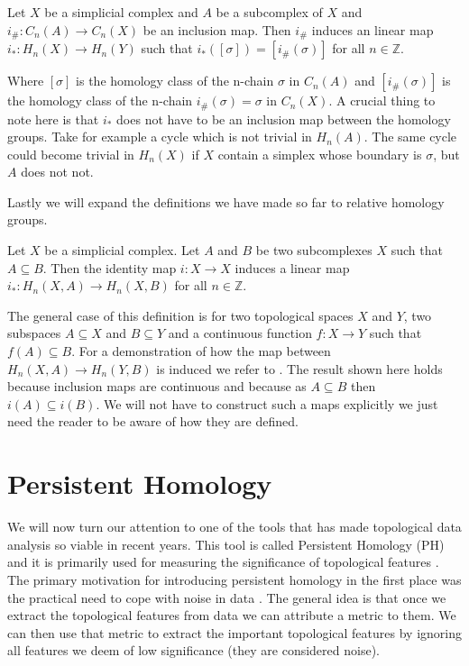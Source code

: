 \begin{defn} Let $X$ be a simplicial complex and $A$ be a subcomplex of $X$ and $i_\#: C_n(A) \to C_n(X)$ be an inclusion map. Then $i_\#$ induces an linear map $i_*: H_n(X) \to H_n(Y)$ such that $i_*([\sigma]) = [i_\#(\sigma)]$ for all $n \in \mathbb{Z}$.
\end{defn}

Where $[\sigma]$ is the homology class of the n-chain $\sigma$ in $C_n(A)$ and $[i_\#(\sigma)]$ is the homology class of the n-chain $i_\#(\sigma) = \sigma$ in $C_n(X)$. A crucial thing to note here is that $i_*$ does not have to be an inclusion map between the homology groups. Take for example a cycle which is not trivial in $H_n(A)$. The same cycle could become trivial in $H_n(X)$ if $X$ contain a simplex whose boundary is $\sigma$, but $A$ does not not.

Lastly we will expand the definitions we have made so far to relative homology groups.

\begin{defn} Let $X$ be a simplicial complex. Let $A$ and $B$ be two subcomplexes $X$ such that $A \subseteq B$. Then the identity map $i: X \to X$ induces a linear map $i_*: H_n(X, A) \to H_n(X, B)$ for all $n \in \mathbb{Z}$.
\label{def:pairs}%
\end{defn}

The general case of this definition is for two topological spaces $X$ and $Y$, two subspaces $A \subseteq X$ and $B \subseteq Y$ and a continuous function $f: X \to Y$ such that $f(A) \subseteq B$. For a demonstration of how the map between $H_n(X, A) \to H_n(Y, B)$ is induced we refer to \cite[p.~118]{algebraic-topology}. The result shown here holds because inclusion maps are continuous and because as  $A \subseteq B$ then $i(A) \subseteq i(B)$. We will not have to construct such a maps explicitly we just need the reader to be aware of how they are defined.


\section{Persistent Homology}

We will now turn our attention to one of the tools that has made topological data analysis so viable in recent years. This tool is called Persistent Homology (PH) and it is primarily used for measuring the significance of topological features \cite{what-is-ph}. The primary motivation for introducing persistent homology in the first place was the practical need to cope with noise in data \cite{ph-a-survey}. The general idea is that once we extract the topological features from data we can attribute a metric to them. We can then use that metric to extract the important topological features by ignoring all features we deem of low significance (they are considered noise).


